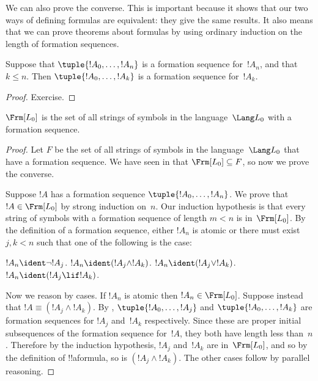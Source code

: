 We can also prove the converse. This is important because it shows
that our two ways of defining formulas are equivalent: they give
the same results. It also means that we can prove theorems about
formulas by using ordinary induction on the length of formation
sequences.

\begin{lem}
Suppose that $\tuple{!A_0,\dotsc,!A_n}$ is a formation sequence
for~$!A_n$, and that $k \leq n$. Then $\tuple{!A_0,\dotsc,!A_k}$
is a formation sequence for~$!A_k$.
\end{lem}

\begin{proof}
Exercise.
\end{proof}

\begin{thm}
$\Frm[L_0]$ is the set of all strings of symbols
in the language~$\Lang L_0$ with a formation sequence.
\end{thm}

\begin{proof}
Let $F$ be the set of all strings of symbols in the
language~$\Lang L_0$ that have a formation sequence.
We have seen in  that
$\Frm[L_0] \subseteq F$, so now we prove the converse.

Suppose $!A$ has a formation sequence $\tuple{!A_0,\dotsc,!A_n}$.
We prove that $!A \in \Frm[L_0]$ by strong induction on~$n$.
Our induction hypothesis is that every string of symbols with a
formation sequence of length $m < n$ is in~$\Frm[L_0]$.
By the definition of a formation sequence, either $!A_n$ is
atomic or there must exist $j,k < n$ such that one of the
following is the case:
\begin{enumerate}
    $!A_n \ident \lnot !A_j$.
    $!A_n \ident (!A_j \land !A_k)$.
    $!A_n \ident (!A_j \lor !A_k)$.
    $!A_n \ident (!A_j \lif !A_k)$.
    
\end{enumerate}
Now we reason by cases. If $!A_n$ is atomic then
$!A_n \in \Frm[L_0]$. Suppose instead that $!A \equiv
(!A_j \land !A_k)$. By ,
$\tuple{!A_0,\dotsc,!A_j}$ and $\tuple{!A_0,\dotsc,!A_k}$ are
formation sequences for $!A_j$ and~$!A_k$ respectively. Since
these are proper initial subsequences of the formation sequence
for~$!A$, they both have length less than~$n$. Therefore by
the induction hypothesis, $!A_j$ and~$!A_k$ are in~$\Frm[L_0]$,
and so by the definition of !!a{formula}, so is
$(!A_j \land !A_k)$. The other cases follow by parallel
reasoning.
\end{proof}






